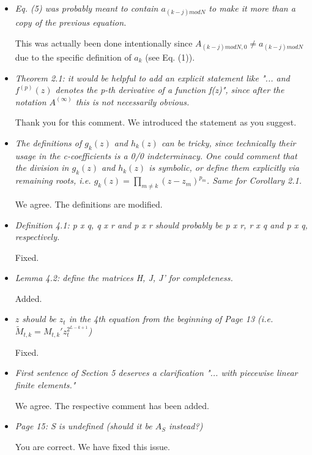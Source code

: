 \documentclass[12pt]{article}
\def\QST{\it\small}
\def\ANS{\noindent\par\rm\normalsize}
\begin{document}
\begin{itemize}

\item\QST
Eq. (5) was probably meant to contain $a_{(k-j) mod N}$ to make it more than a copy of the previous equation.

\ANS

This was actually been done intentionally since $A_{(k-j) mod N, 0} \not= a_{(k-j) mod N}$ due to the specific definition of $a_k$ (see Eq. (1)).

\item\QST
Theorem 2.1: it would be helpful to add an explicit statement like "... and $f^{(p)}(z)$ denotes the p-th derivative of a function f(z)", since after the notation $A^{(\infty)}$ this is not necessarily obvious.

\ANS

Thank you for this comment. We introduced the statement as you suggest. 

\item\QST
The definitions of $g_k(z)$ and $h_k(z)$ can be tricky, since technically their usage in the c-coefficients is a 0/0 indeterminacy. One could comment that the division in $g_k(z)$ and $h_k(z)$ is symbolic, or define them explicitly via remaining roots, i.e. $g_k(z) = \prod_{m \neq k } (z-z_m)^{p_m}$.
 Same for Corollary 2.1.

\ANS

We agree. The definitions are modified. 


\item\QST
Definition 4.1: p x q, q x r and p x r should probably be p x r, r x q and p x q, respectively.

\ANS

Fixed.

\item\QST
Lemma 4.2: define the matrices H, J, J' for completeness.

\ANS

Added.

\item\QST
$z$ should be $z_t$ in the 4th equation from the beginning of Page 13 (i.e. $\tilde M_{t,k} = M_{t,k}' z_t^{2^{L-k+1}}$)

\ANS

Fixed.

\item\QST
First sentence of Section 5 deserves a clarification "... with piecewise linear finite elements."

\ANS

We agree. The respective comment has been added.

\item\QST
 Page 15: S is undefined (should it be $A_S$ instead?)

\ANS

You are correct. We have fixed this issue.
	
\end{itemize}
\end{document}
